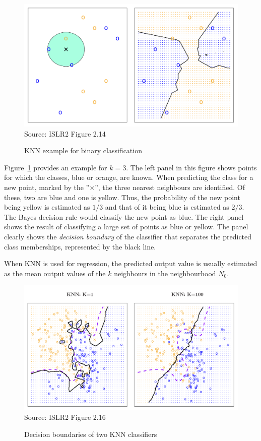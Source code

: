 \begin{figure}
\centering
\includegraphics[width=.75\textwidth]{Figures_Chapters_1-6/Chapter2/2_14.pdf} \\
\vspace{3mm}
\scriptsize Source: ISLR2 Figure 2.14
\caption{KNN example for binary classification}
\label{fig:knn1}
\end{figure}

Figure~\ref{fig:knn1} provides an example for $k=3$. The left panel in this figure shows points for which the classes, blue or orange, are known. When predicting the class for a new point, marked by the ''$\times$'', the three nearest neighbours are identified. Of these, two are blue and one is yellow. Thus, the probability of the new point being yellow is estimated as $1/3$ and that of it being blue is estimated as $2/3$. The Bayes decision rule would classify the new point as blue. The right panel shows the result of classifying a large set of points as blue or yellow. The panel clearly shows the \emph{decision boundary} of the classifier that separates the predicted class memberships, represented by the black line.

When KNN is used for regression, the predicted output value is usually estimated as the mean output values of the $k$ neighbours in the neighbourhood $N_0$.

\begin{figure}
\centering
\includegraphics[width=.75\textwidth]{Figures_Chapters_1-6/Chapter2/2_16.pdf} \\
\vspace{3mm}
\scriptsize Source: ISLR2 Figure 2.16
\caption{Decision boundaries of two KNN classifiers}
\label{fig:knn2}
\end{figure}

